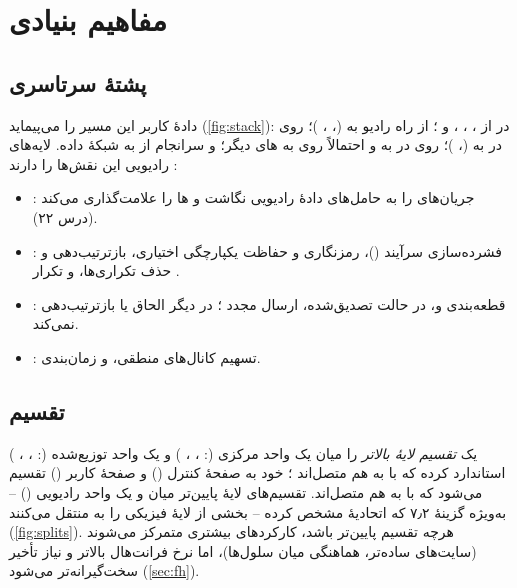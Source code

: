 \documentclass[11pt,a4paper]{article}
\begin{document}
\section{مفاهیم بنیادی}

\subsection{پشتهٔ سرتاسری}
دادهٔ کاربر این مسیر را می‌پیماید (\cref{fig:stack}): در  از ، ، ،  و ؛ از راه رادیو
به  (، ، )؛ روی  در  به  (، )؛ روی  در
 به  و احتمالاً روی  به های دیگر؛ و سرانجام از  به شبکهٔ داده. لایه‌های رادیویی این نقش‌ها را
دارند \cite{ts38300}:
\begin{itemize}
  \item \textbf{}: جریان‌های  را به حامل‌های دادهٔ رادیویی نگاشت و ها را علامت‌گذاری می‌کند (درس ۲۲).
  \item \textbf{}: فشرده‌سازی سرآیند ()، رمزنگاری و حفاظت یکپارچگی اختیاری، بازترتیب‌دهی و حذف تکراری‌ها، و تکرار
        .
  \item \textbf{}: قطعه‌بندی و، در حالت تصدیق‌شده، ارسال مجدد ؛  در  دیگر الحاق یا بازترتیب‌دهی نمی‌کند.
  \item \textbf{}: تسهیم کانال‌های منطقی،  و زمان‌بندی.
\end{itemize}

\begin{acnfigure}
  \caption{پشتهٔ پروتکل صفحهٔ کاربر نسل پنجم با یک  تقسیم‌شده ( و ).}
  \label{fig:stack}
\end{acnfigure}

\subsection{تقسیم }
 یک \emph{تقسیم لایهٔ بالاتر} را میان یک واحد مرکزی (: ، ، ) و یک واحد توزیع‌شده (:
، ، ) استاندارد کرده که با  به هم متصل‌اند \cite{ts38401}؛  خود به صفحهٔ کنترل () و صفحهٔ
کاربر () تقسیم می‌شود که با  به هم متصل‌اند. تقسیم‌های لایهٔ پایین‌تر میان  و یک واحد رادیویی () -- به‌ویژه
گزینهٔ ۷٫۲ که اتحادیهٔ  مشخص کرده -- بخشی از لایهٔ فیزیکی را به  منتقل می‌کنند (\cref{fig:splits}). هرچه تقسیم پایین‌تر
باشد، کارکردهای بیشتری متمرکز می‌شوند (سایت‌های ساده‌تر، هماهنگی میان سلول‌ها)، اما نرخ فرانت‌هال بالاتر و نیاز تأخیر سخت‌گیرانه‌تر
می‌شود (\cref{sec:fh}).
\end{document}
